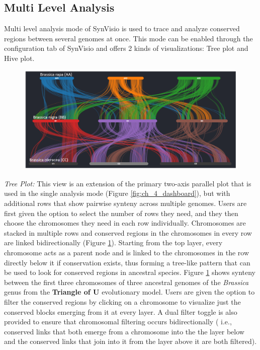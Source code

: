 \subsection{Multi Level Analysis}
Multi level analysis mode of SynVisio is used to trace and analyze conserved regions between several genomes at once. This mode can be enabled through the configuration tab of SynVisio and offers 2 kinds of visualizations: Tree plot and Hive plot.

\begin{figure}
  \centering
  \includegraphics[width=1\linewidth]{images/ch_5_tree_plot.PNG}
  \label{fig:ch_5_tree_plot}
\end{figure} 

\textit{Tree Plot:} This view is an extension of the primary two-axis parallel plot that is used in the single analysis mode (Figure \ref{fig:ch_4_dashboard}), but with additional rows that show pairwise synteny across multiple genomes. Users are first given the option to select the number of rows they need, and they then choose the chromosomes they need in each row individually. Chromosomes are stacked in multiple rows and conserved regions in the chromosomes in every row are linked bidirectionally (Figure \ref{fig:ch_5_tree_plot}). Starting from the top layer, every chromosome acts as a parent node and is linked to the chromosomes in the row directly below it if conservation exists, thus forming a tree-like pattern that can be used to look for conserved regions in ancestral species. Figure \ref{fig:ch_5_tree_plot} shows synteny between the first three chromosomes of three ancestral genomes of the \textit{Brassica} genus from the \textbf{Triangle of U} evolutionary model\cite{cheng2014genome}. Users are given the option to filter the conserved regions by clicking on a chromosome to visualize just the conserved blocks emerging from it at every layer. A dual filter toggle is also provided to ensure that chromosomal filtering occurs bidirectionally ( i.e., conserved links that both emerge from a chromosome into the the layer below and the conserved links that join into it from the layer above it are both filtered).

